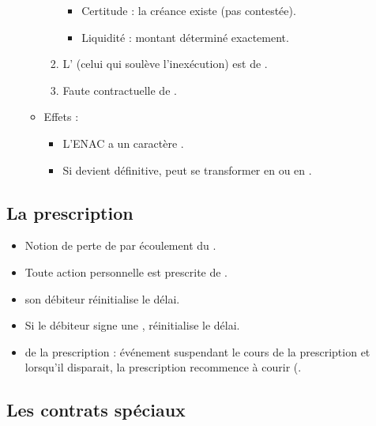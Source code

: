 \begin{enumerate}
\begin{itemize}
\begin{enumerate}
			\begin{itemize}
				\item Certitude : la créance existe (pas contestée).
				\item Liquidité : montant déterminé exactement.
			\end{itemize}
			\item L' (celui qui soulève l'inexécution) est de .
			\item Faute contractuelle de .
		\end{enumerate}
		\item Effets :
		\begin{itemize}
			\item L'ENAC a un caractère .
			\item Si devient définitive, peut se transformer en  ou en .
		\end{itemize}
	\end{itemize}
\end{enumerate}

\subsection{La prescription}

\begin{itemize}
	\item Notion de perte de  par écoulement du .
	\item Toute action personnelle est prescrite de .
	\item {} son débiteur  réinitialise le délai.
	\item Si le débiteur signe une , réinitialise le délai.
	\item {} de la prescription : événement suspendant le cours de la prescription et lorsqu'il disparait, la prescription recommence à courir (.
\end{itemize}

\subsection{Les contrats spéciaux}

